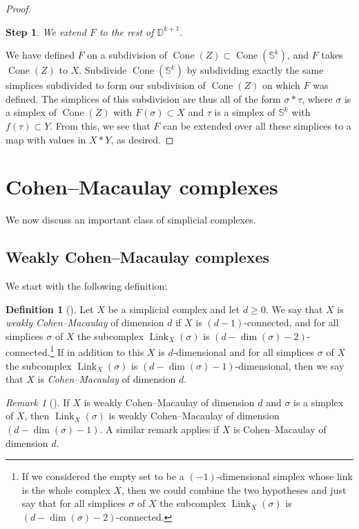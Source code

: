 \documentclass[11pt]{amsart}
\numberwithin{equation}{section}
\theoremstyle{plain}
\newtheorem{stepsa}{Step}
\theoremstyle{definition}
\newtheorem{defn}[theorem]{Definition}
\newenvironment{definition}[1][]{\begin{defn}[#1]\pushQED{\qed}}{\popQED \end{defn}}
\theoremstyle{remark}
\newtheorem{rmk}[theorem]{Remark}
\newenvironment{remark}[1][]{\begin{rmk}[#1] \pushQED{\qed}}{\popQED \end{rmk}}
\newcommand\bbD{\ensuremath{\mathbb{D}}}
\newcommand\bbS{\ensuremath{\mathbb{S}}}
\DeclareMathOperator{\Link}{Link}
\DeclareMathOperator{\Cone}{Cone}
\begin{document}
\begin{proof}
\begin{stepsa}
We extend $F$ to the rest of $\bbD^{k+1}$.
\end{stepsa}

We have defined $F$ on a subdivision of $\Cone(Z) \subset \Cone(\bbS^k)$, and $F$ takes $\Cone(Z)$ to $X$.  Subdivide
$\Cone(\bbS^k)$ by subdividing exactly the same simplices subdivided to form our subdivision of $\Cone(Z)$ on
which $F$ was defined.  The simplices of this subdivision are thus all of the form $\sigma \ast \tau$, where
$\sigma$ is a simplex of $\Cone(Z)$ with $F(\sigma) \subset X$ and $\tau$ is a simplex of $\bbS^k$ with $f(\tau) \subset Y$.
From this, we see that $F$ can be extended over all these simplices to a map with values in $X \ast Y$, as desired.
\end{proof}

\section{Cohen--Macaulay complexes}
\label{section:cohenmac}

We now discuss an important class of simplicial complexes.

\subsection{Weakly Cohen--Macaulay complexes}
We start with the following definition:

\begin{definition}
\label{definition:cm}
Let $X$ be a simplicial complex and let $d \geq 0$.
We say that $X$ is {\em weakly Cohen--Macaulay} of dimension $d$ if $X$ is $(d-1)$-connected,
and for all simplices $\sigma$ of $X$ the subcomplex $\Link_X(\sigma)$ is 
$(d-\dim(\sigma)-2)$-connected.\footnote{If we considered the empty set to be a $(-1)$-dimensional
simplex whose link is the whole complex $X$, then we could combine the two hypotheses and just
say that for all simplices $\sigma$ of $X$ the subcomplex $\Link_X(\sigma)$ is 
$(d-\dim(\sigma)-2)$-connected.}
If in addition to this $X$ is $d$-dimensional and for all simplices $\sigma$ of $X$ the subcomplex
$\Link_X(\sigma)$ is $(d-\dim(\sigma)-1)$-dimensional, then we say that $X$ is {\em Cohen--Macaulay} of dimension $d$.
\end{definition}

\begin{remark}
If $X$ is weakly Cohen--Macaulay of dimension $d$ and $\sigma$ is a simplex of $X$, then
$\Link_X(\sigma)$ is weakly Cohen--Macaulay of dimension $(d-\dim(\sigma)-1)$.  A similar
remark applies if $X$ is Cohen--Macaulay of dimension $d$.
\end{remark}
\end{document}
